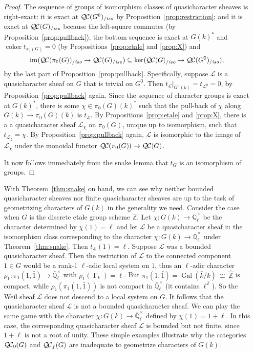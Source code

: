 \documentclass[11pt]{amsart}
\theoremstyle{plain}
\theoremstyle{definition}
\theoremstyle{remark}
\newcommand{\ZZ}{{\mathbb{Z}}}
\newcommand{\EE}{\mathbb{\bar Q}_\ell}
\newcommand{\bFq}{\bar{k}}
\newcommand{\Fq}{k}
\newcommand{\EEx}{\EE^\times}
\DeclareMathOperator{\Gal}{Gal}
\newcommand{\Frob}[1]{\operatorname{F}_{#1}}
\DeclareMathOperator{\coker}{coker}
\newcommand{\iso}{{\ \cong\ }}
\newcommand{\cs}[1]{{\mathcal{#1}}}
\newcommand{\gcs}[1]{{\mathcal{\bar #1}}}
\newcommand{\QC}{{\mathcal{Q\hskip-0.8pt C}}}
\newcommand{\QCb}{{\QC_0}}
\newcommand{\QCf}{{\QC_f}}
\newcommand{\QCiso}[1]{\QC(#1)_{/\textit{iso}}}
\newcommand{\image}{{\operatorname{im}}}
\newcommand{\trFrob}[1]{t_{#1}}
\begin{document}
\begin{proof}
  The sequence of groups of isomorphism classes of quasicharacter sheaves is right-exact: it is exact at
  $\QCiso{G^0}$ by Proposition~\ref{prop:restriction}; and
  it is exact at $\QCiso{G}$ because the left-square
  commutes (by Proposition~\ref{prop:pullback}), the bottom sequence
  is exact at $G(\Fq)^*$ and $\coker \trFrob{\pi_0(G)} =0$
  (by Propositions~\ref{prop:etale} and \ref{prop:X}) and
  \[
  \image(\QCiso{\pi_0(G)} \to \QCiso{G}) \subseteq \ker(\QCiso{G} \to \QCiso{G^0}),
  \]
  by the last part of Proposition~\ref{prop:pullback}. Specifically,
  suppose $\cs{L}$ is a quasicharacter sheaf on $G$ that is trivial on
  $G^0$. Then $\trFrob{\cs{L}}\vert_{G^0(\Fq)} = \trFrob{\cs{L}^0} =0$,
  by Proposition~\ref{prop:pullback} again. Since the sequence of
  character groups is exact at $G(\Fq)^*$, there is
  some $\chi \in \pi_0(G)(\Fq)^*$ such that the
  pull-back of $\chi$ along $G(\Fq)\to \pi_0(G)(\Fq)$ is
  $\trFrob{\cs{L}}$. By Propositions~\ref{prop:etale} and \ref{prop:X},
  there is a a quasicharacter sheaf $\cs{L}_\chi$ on $\pi_0(G)$, unique up
  to isomorphism, such that $\trFrob{\cs{L}_\chi} = \chi$. By
  Proposition~\ref{prop:pullback} again, $\cs{L}$ is isomorphic to the
  image of $\cs{L}_\chi$ under the monoidal functor $\QC(\pi_0(G)) \to \QC(G)$.

  It now follows immediately from the snake lemma that $\trFrob{G}$ is an
  isomorphism of groups.
\end{proof}

With Theorem~\ref{thm:snake} on hand, 
we can see why neither bounded quasicharacter sheaves 
nor finite quasicharacter sheaves are up to the task of 
geometrizing characters of $G(\Fq)$ in the generality we need.  
%
Consider the case when $G$ is the discrete etale group scheme $\ZZ$. 
Let $\chi : G(\Fq) \to \EEx$ be the character determined by $\chi(1) = \ell$ 
and let $\cs{L}$ be a quasicharacter sheaf in the isomorphism class 
corresponding to the character $\chi : G(\Fq) \to \EEx$ under Theorem~\ref{thm:snake}. 
Then $\trFrob{\cs{L}}(1) = \ell$. Suppose $\cs{L}$ was a bounded quasicharacter sheaf. 
Then the restriction of $\cs{L}$ to the connected component $1\in G$ 
would be a rank-1 $\ell$-adic local system on $1$, 
thus an $\ell$-adic character $\rho_1 : \pi_1(1,{\bar 1}) \to \EEx$ with $\rho_1(\Frob{\Fq}) = \ell$. But $\pi_1(1,{\bar 1}) = \Gal(\bFq/\Fq) \iso {\hat \ZZ}$ is compact, 
while $\rho_1(\pi_1(1,{\bar 1}))$ is not compact in $\EEx$ (it contains $\ell^\ZZ$). 
So the Weil sheaf $\gcs{L}$ does not descend to a local system on $G$.
It follows that the quasicharacter sheaf $\cs{L}$ is not a bounded quasicharacter sheaf.
%
We can play the same game with the character $\chi : G(\Fq) \to \EEx$ 
defined by $\chi(1) = 1+\ell$. In this case, the corresponding quasicharacter sheaf $\cs{L}$ is bounded but not finite, since $1+\ell$ is not a root of unity. 
%
These simple examples illustrate why the categories $\QCb(G)$ and $\QCf(G)$ are inadequate to geometrize characters of $G(\Fq)$.
\end{document}

